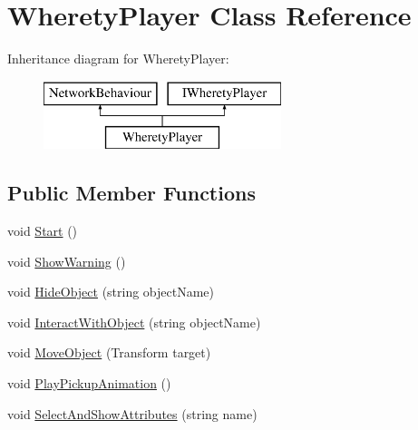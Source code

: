 \hypertarget{class_wherety_player}{}\section{Wherety\+Player Class Reference}
\label{class_wherety_player}
Inheritance diagram for Wherety\+Player\+:\begin{figure}[H]
\begin{center}
\leavevmode
\includegraphics[height=2.000000cm]{class_wherety_player}
\end{center}
\end{figure}
\subsection*{Public Member Functions}
\begin{DoxyCompactItemize}
\item 
void \mbox{\hyperlink{class_wherety_player_a31c5250223298c32c6909fb84772fad8}{Start}} ()
\item 
void \mbox{\hyperlink{class_wherety_player_a028e387db9360e7ba6b8530d1af5c6cf}{Show\+Warning}} ()
\item 
void \mbox{\hyperlink{class_wherety_player_a0b6974f0ad99de9dd1af2fb65f498264}{Hide\+Object}} (string object\+Name)
\item 
void \mbox{\hyperlink{class_wherety_player_a7f1fc81fea5ae4a082fc72b766171834}{Interact\+With\+Object}} (string object\+Name)
\item 
void \mbox{\hyperlink{class_wherety_player_a932686a63036f030e38a10f361d9d5d3}{Move\+Object}} (Transform target)
\item 
void \mbox{\hyperlink{class_wherety_player_acf5cc5d3c1f191864bdbfa501474ec24}{Play\+Pickup\+Animation}} ()
\item 
void \mbox{\hyperlink{class_wherety_player_a9d18e586a183cf3fcf768c863ca7575d}{Select\+And\+Show\+Attributes}} (string name)
\end{DoxyCompactItemize}
